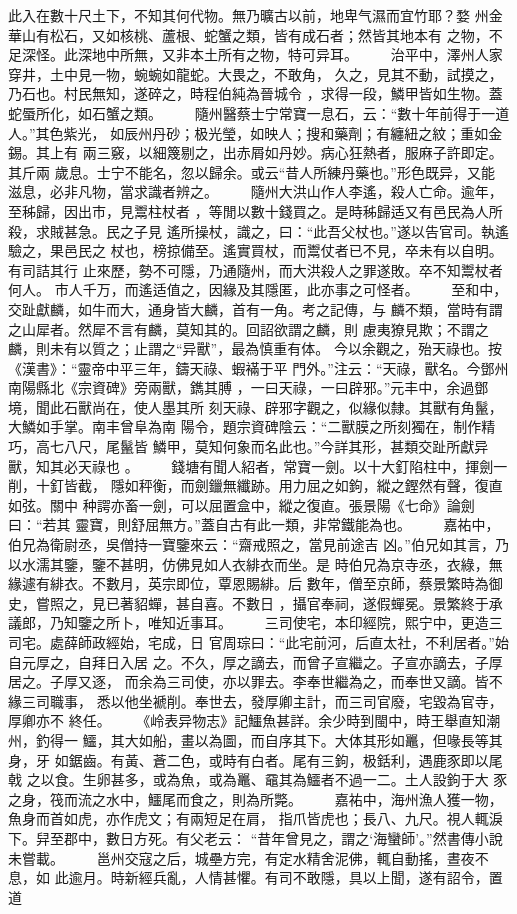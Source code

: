 \documentclass{ctexart}
\begin{document}
此入在數十尺土下，不知其何代物。無乃曠古以前，地卑气濕而宜竹耶？婺 州金華山有松石，又如核桃、蘆根、蛇蟹之類，皆有成石者；然皆其地本有 之物，不足深怪。此深地中所無，又非本土所有之物，特可异耳。 　　治平中，澤州人家穿井，土中見一物，蜿蜿如龍蛇。大畏之，不敢角， 久之，見其不動，試摸之，乃石也。村民無知，遂碎之，時程伯純為晉城令 ，求得一段，鱗甲皆如生物。蓋蛇蜃所化，如石蟹之類。 　　隨州醫蔡士宁常寶一息石，云：``數十年前得于一道人。''其色紫光， 如辰州丹砂；极光瑩，如映人；搜和藥劑；有纏紐之紋；重如金錫。其上有 兩三竅，以細篾剔之，出赤屑如丹妙。病心狂熱者，服麻子許即定。其斤兩 歲息。士宁不能名，忽以歸余。或云``昔人所練丹藥也。''形色既异，又能 滋息，必非凡物，當求識者辨之。 　　隨州大洪山作人李遙，殺人亡命。逾年，至秭歸，因出市，見鬻柱杖者 ，等閒以數十錢買之。是時秭歸适又有邑民為人所殺，求賊甚急。民之子見 遙所操杖，識之，曰：``此吾父杖也。''遂以告官司。執遙驗之，果邑民之 杖也，榜掠備至。遙實買杖，而鬻仗者已不見，卒未有以自明。有司詰其行 止來歷，勢不可隱，乃通隨州，而大洪殺人之罪遂敗。卒不知鬻杖者何人。 市人千万，而遙适值之，因緣及其隱匿，此亦事之可怪者。 　　至和中，交趾獻麟，如牛而大，通身皆大麟，首有一角。考之記傳，与 麟不類，當時有謂之山犀者。然犀不言有麟，莫知其的。回詔欲謂之麟，則 慮夷獠見欺；不謂之麟，則未有以質之；止謂之``异獸''，最為慎重有体。 今以余觀之，殆天祿也。按《漢書》：``靈帝中平三年，鑄天祿、蝦襔于平 門外。''注云：``天祿，獸名。今鄧州南陽縣北《宗資碑》旁兩獸，鐫其膊 ，一曰天祿，一曰辟邪。''元丰中，余過鄧境，聞此石獸尚在，使人墨其所 刻天祿、辟邪字觀之，似緣似隸。其獸有角鬣，大鱗如手掌。南丰曾阜為南 陽令，題宗資碑陰云：``二獸膜之所刻獨在，制作精巧，高七八尺，尾鬣皆 鱗甲，莫知何象而名此也。''今詳其形，甚類交趾所獻异獸，知其必天祿也 。 　　錢塘有聞人紹者，常寶一劍。以十大釘陷柱中，揮劍一削，十釘皆截， 隱如秤衡，而劍鑞無纖跡。用力屈之如鉤，縱之鏗然有聲，復直如弦。關中 种諤亦畜一劍，可以屈置盒中，縱之復直。張景陽《七命》論劍曰：``若其 靈寶，則舒屈無方。''蓋自古有此一類，非常鐵能為也。 　　嘉祐中，伯兄為衛尉丞，吳僧持一寶鑒來云：``齋戒照之，當見前途吉 凶。''伯兄如其言，乃以水濡其鑒，鑒不甚明，仿佛見如人衣緋衣而坐。是 時伯兄為京寺丞，衣綠，無緣遽有緋衣。不數月，英宗即位，覃恩賜緋。后 數年，僧至京師，蔡景繁時為御史，嘗照之，見已著貂蟬，甚自喜。不數日 ，攝官奉祠，遂假蟬冕。景繁終于承議郎，乃知鑒之所卜，唯知近事耳。 　　三司使宅，本印經院，熙宁中，更造三司宅。處薛師政經始，宅成，日 官周琮曰：``此宅前河，后直太社，不利居者。''始自元厚之，自拜日入居 之。不久，厚之謫去，而曾子宣繼之。子宣亦謫去，子厚居之。子厚又逐， 而余為三司使，亦以罪去。李奉世繼為之，而奉世又謫。皆不緣三司職事， 悉以他坐褫削。奉世去，發厚卿主計，而三司官廢，宅毀為官寺，厚卿亦不 終任。 　　《岭表异物志》記鱷魚甚詳。余少時到閩中，時王舉直知潮州，釣得一 鱷，其大如船，畫以為圖，而自序其下。大体其形如鼉，但喙長等其身，牙 如鋸齒。有黃、蒼二色，或時有白者。尾有三鉤，极銛利，遇鹿豕即以尾戟 之以食。生卵甚多，或為魚，或為鼉、黿其為鱷者不過一二。土人設鉤于大 豕之身，筏而流之水中，鱷尾而食之，則為所斃。 　　嘉祐中，海州漁人獲一物，魚身而首如虎，亦作虎文；有兩短足在肩， 指爪皆虎也；長八、九尺。視人輒淚下。舁至郡中，數日方死。有父老云： ``昔年曾見之，謂之`海蠻師'。''然書傳小說未嘗載。 　　邕州交寇之后，城壘方完，有定水精舍泥佛，輒自動搖，晝夜不息，如 此逾月。時新經兵亂，人情甚懼。有司不敢隱，具以上聞，遂有詔令，置道 
\end{document}
